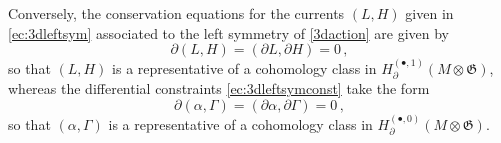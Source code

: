 \documentclass[11pt]{amsart}
\newcommand{\CA}{{\mathcal A}}
\newcommand{\fg}{\mathfrak{g}}
\newcommand{\fh}{\mathfrak{h}}
\newcommand{\fG}{\mathfrak{G}}
\numberwithin{equation}{section}
\numberwithin{figure}{section}
\numberwithin{table}{section}
\newcommand{\cA}{\mathcal{A}}
\theoremstyle{thm}
\newtheorem{prop}[theorem]{Proposition}
\numberwithin{equation}{subsection}
\theoremstyle{definition}
\theoremstyle{rem}
\begin{document}
Conversely, the conservation equations for the currents $(L,H)$ given in \eqref{ec:3dleftsym} associated to the left symmetry of \eqref{3daction} are given by 
\begin{equation}
    \partial (L,H) = (\partial L, \partial H)=0 \,,
\end{equation}
so that $(L,H)$ is a representative of a cohomology class in $H^{(\bullet,1)}_\partial(M\otimes \fG)$, whereas the differential constraints \eqref{ec:3dleftsymconst} take the form
\begin{equation}
    \partial (\alpha,\Gamma)=(\partial \alpha,\partial\Gamma)=0 \,,
\end{equation}
so that $(\alpha,\Gamma)$ is a representative of a cohomology class in $H^{(\bullet,0)}_\partial(M\otimes \fG)$. 
\end{document}
